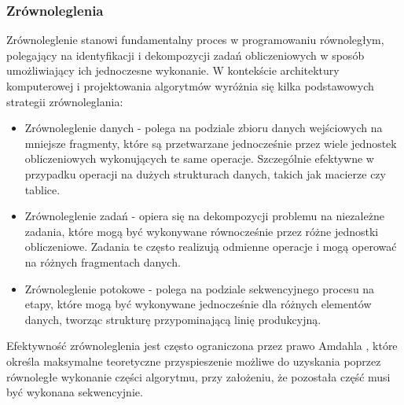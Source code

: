 \subsubsection{Zrównoleglenia}
Zrównoleglenie  stanowi fundamentalny proces w programowaniu równoległym, polegający na identyfikacji i dekompozycji zadań obliczeniowych w sposób umożliwiający ich jednoczesne wykonanie. W kontekście architektury komputerowej i projektowania algorytmów wyróżnia się kilka podstawowych strategii zrównoleglania:
\begin{itemize}
    \item Zrównoleglenie danych - polega na podziale zbioru danych wejściowych na mniejsze fragmenty, które są przetwarzane jednocześnie przez wiele jednostek obliczeniowych wykonujących te same operacje. Szczególnie efektywne w przypadku operacji na dużych strukturach danych, takich jak macierze czy tablice.
    \item Zrównoleglenie zadań - opiera się na dekompozycji problemu na niezależne zadania, które mogą być wykonywane równocześnie przez różne jednostki obliczeniowe. Zadania te często realizują odmienne operacje i mogą operować na różnych fragmentach danych.
    \item Zrównoleglenie potokowe - polega na podziale sekwencyjnego procesu na etapy, które mogą być wykonywane jednocześnie dla różnych elementów danych, tworząc strukturę przypominającą linię produkcyjną.
\end{itemize}

Efektywność zrównoleglenia jest często ograniczona przez prawo Amdahla \cite{amdahl}, które określa maksymalne teoretyczne przyspieszenie możliwe do uzyskania poprzez równoległe wykonanie części algorytmu, przy założeniu, że pozostała część musi być wykonana sekwencyjnie.

